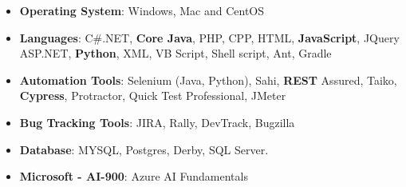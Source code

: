 \begin{cvparagraph}
\begin{itemize}
\item {\textbf{Operating System}: Windows, Mac and CentOS}
\item {\textbf{Languages}: C\#.NET, \textbf{Core Java}, PHP, CPP, HTML, \textbf{JavaScript}, JQuery ASP.NET, \textbf{Python}, XML, VB Script, Shell script, Ant, Gradle}
\item {\textbf{Automation  Tools}: Selenium (Java, Python), Sahi, \textbf{REST} Assured, Taiko, \textbf{Cypress}, Protractor, Quick Test Professional, JMeter}
\item {\textbf{Bug Tracking Tools}: JIRA, Rally, DevTrack, Bugzilla }
\item {\textbf{Database}: MYSQL, Postgres, Derby, SQL Server.}
\end{itemize}
\begin{itemize}
\item {\textbf{Microsoft - AI-900}: Azure AI Fundamentals}
\end{itemize}
\end{cvparagraph}
